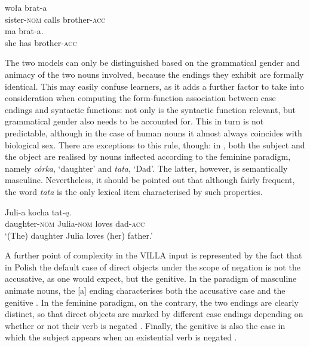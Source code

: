 \ea%
    \label{ex:08:4}
    \ea\label{ex:08:4a}
       {woła}   {brat-a} \\
            sister-\textsc{nom} calls   brother-\textsc{acc}\\
    \ex\label{ex:08:4b}
       {ma}   {brat-a.}\\
            she  has  brother-\textsc{acc}\\
    \glt   
    \z
\z

The two models can only be distinguished based on the grammatical gender and animacy of the two nouns involved, because the endings they exhibit are formally identical. This may easily confuse learners, as it adds a further factor to take into consideration when computing the form-function association between case endings and syntactic functions: not only is the syntactic function relevant, but grammatical gender also needs to be accounted for. This in turn is not predictable, although in the case of human nouns it almost always coincides with biological sex. There are exceptions to this rule, though: in , both the subject and the object are realised by nouns inflected according to the feminine paradigm, namely \textit{córka}, ‘daughter’ and \textit{tata}, ‘Dad’. The latter, however, is semantically masculine. Nevertheless, it should be pointed out that although fairly frequent, the word \textit{tata} is the only lexical item characterised by such properties.

\ea%
    \label{ex:08:5}
         {Juli-a}     {kocha} {tat-ę.}\\
            daughter-\textsc{nom}  Julia-\textsc{nom}  loves  dad-\textsc{acc}\\
    \glt    ‘(The) daughter Julia loves (her) father.’
    \z

A further point of complexity in the VILLA input is represented by the fact that in Polish the default case of direct objects under the scope of negation is not the accusative, as one would expect, but the genitive. In the paradigm of masculine animate nouns, the [a] ending characterises both the accusative case and the genitive . In the feminine paradigm, on the contrary, the two endings are clearly distinct, so that direct objects are marked by different case endings depending on whether or not their verb is negated . Finally, the genitive is also the case in which the subject appears when an existential verb is negated .

